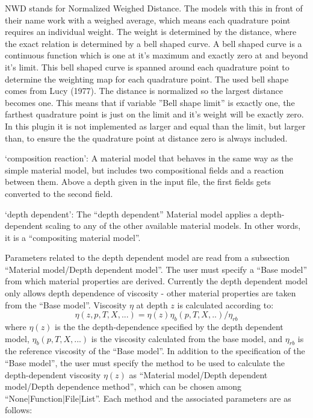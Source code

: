 \begin{itemize}
NWD stands for Normalized Weighed Distance. The models with this in front of their name work with a weighed average, which means each quadrature point requires an individual weight. The weight is determined by the distance, where the exact relation is determined by a bell shaped curve. A bell shaped curve is a continuous function which is one at it's maximum and exactly zero at and beyond it's limit. This bell shaped curve is spanned around each quadrature point to determine the weighting map for each quadrature point. The used bell shape comes from Lucy (1977). The distance is normalized so the largest distance becomes one. This means that if variable ''Bell shape limit'' is exactly one, the farthest quadrature point is just on the limit and it's weight will be exactly zero. In this plugin it is not implemented as larger and equal than the limit, but larger than, to ensure the the quadrature point at distance zero is always included.

`composition reaction': A material model that behaves in the same way as the simple material model, but includes two compositional fields and a reaction between them. Above a depth given in the input file, the first fields gets converted to the second field. 

`depth dependent': The ``depth dependent'' Material model applies a depth-dependent scaling to any of the other available material models. In other words, it is a ``compositing material model''.

Parameters related to the depth dependent model are read from a subsection ``Material model/Depth dependent model''. The user must specify a ``Base model'' from which material properties are derived. Currently the depth dependent model only allows depth dependence of viscosity - other material properties are taken from the ``Base model''. Viscosity $\eta$ at depth $z$ is calculated according to:\begin{equation}\eta(z,p,T,X,...) = \eta(z) \eta_b(p,T,X,..)/\eta_{rb}\end{equation}where $\eta(z)$ is the the depth-dependence specified by the depth dependent model, $\eta_b(p,T,X,...)$ is the viscosity calculated from the base model, and $\eta_{rb}$ is the reference viscosity of the ``Base model''. In addition to the specification of the ``Base model'', the user must specify the method to be used to calculate the depth-dependent viscosity $\eta(z)$ as ``Material model/Depth dependent model/Depth dependence method'', which can be chosen among ``None|Function|File|List''. Each method and the associated parameters are as follows:


\end{itemize}
